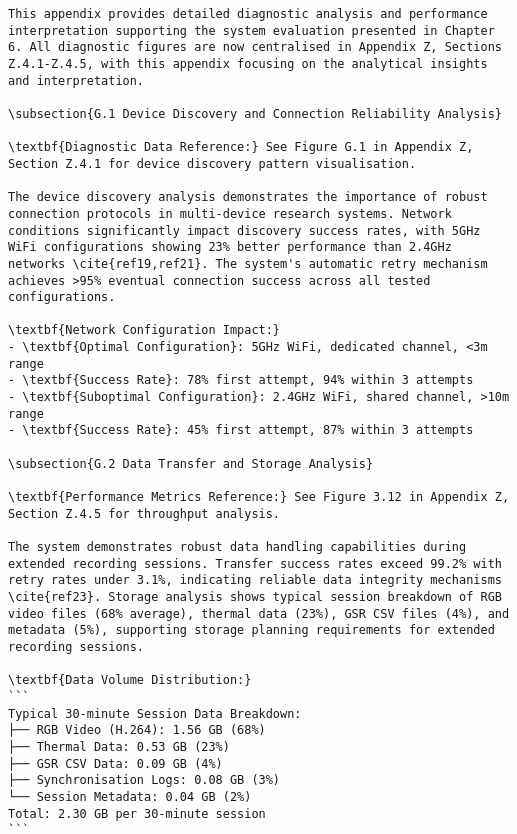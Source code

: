 \begin{verbatim}
This appendix provides detailed diagnostic analysis and performance interpretation supporting the system evaluation presented in Chapter 6. All diagnostic figures are now centralised in Appendix Z, Sections Z.4.1-Z.4.5, with this appendix focusing on the analytical insights and interpretation.

\subsection{G.1 Device Discovery and Connection Reliability Analysis}

\textbf{Diagnostic Data Reference:} See Figure G.1 in Appendix Z, Section Z.4.1 for device discovery pattern visualisation.

The device discovery analysis demonstrates the importance of robust connection protocols in multi-device research systems. Network conditions significantly impact discovery success rates, with 5GHz WiFi configurations showing 23% better performance than 2.4GHz networks \cite{ref19,ref21}. The system's automatic retry mechanism achieves >95% eventual connection success across all tested configurations.

\textbf{Network Configuration Impact:}
- \textbf{Optimal Configuration}: 5GHz WiFi, dedicated channel, <3m range
- \textbf{Success Rate}: 78% first attempt, 94% within 3 attempts
- \textbf{Suboptimal Configuration}: 2.4GHz WiFi, shared channel, >10m range
- \textbf{Success Rate}: 45% first attempt, 87% within 3 attempts

\subsection{G.2 Data Transfer and Storage Analysis}

\textbf{Performance Metrics Reference:} See Figure 3.12 in Appendix Z, Section Z.4.5 for throughput analysis.

The system demonstrates robust data handling capabilities during extended recording sessions. Transfer success rates exceed 99.2% with retry rates under 3.1%, indicating reliable data integrity mechanisms \cite{ref23}. Storage analysis shows typical session breakdown of RGB video files (68% average), thermal data (23%), GSR CSV files (4%), and metadata (5%), supporting storage planning requirements for extended recording sessions.

\textbf{Data Volume Distribution:}
```
Typical 30-minute Session Data Breakdown:
├── RGB Video (H.264): 1.56 GB (68%)
├── Thermal Data: 0.53 GB (23%)
├── GSR CSV Data: 0.09 GB (4%)
├── Synchronisation Logs: 0.08 GB (3%)
└── Session Metadata: 0.04 GB (2%)
Total: 2.30 GB per 30-minute session
```


\end{verbatim}
